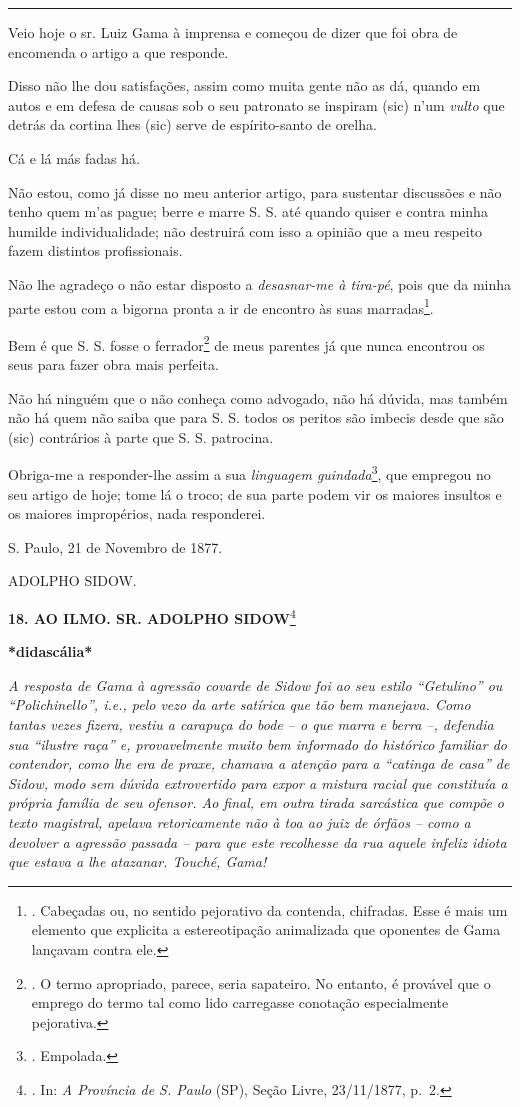 \begin{center}\rule{0.5\linewidth}{\linethickness}\end{center}

Veio hoje o sr. Luiz Gama à imprensa e começou de dizer que foi obra de
encomenda o artigo a que responde.

Disso não lhe dou satisfações, assim como muita gente não as dá, quando
em autos e em defesa de causas sob o seu patronato se inspiram (sic)
n'um \emph{vulto} que detrás da cortina lhes (sic) serve de
espírito-santo de orelha.

Cá e lá más fadas há.

Não estou, como já disse no meu anterior artigo, para sustentar
discussões e não tenho quem m'as pague; berre e marre S. S. até quando
quiser e contra minha humilde individualidade; não destruirá com isso a
opinião que a meu respeito fazem distintos profissionais.

Não lhe agradeço o não estar disposto a \emph{desasnar-me à tira-pé},
pois que da minha parte estou com a bigorna pronta a ir de encontro às
suas marradas\footnote{. Cabeçadas ou, no sentido pejorativo da
  contenda, chifradas. Esse é mais um elemento que explicita a
  estereotipação animalizada que oponentes de Gama lançavam contra ele.}.

Bem é que S. S. fosse o ferrador\footnote{. O termo apropriado, parece,
  seria sapateiro. No entanto, é provável que o emprego do termo tal
  como lido carregasse conotação especialmente pejorativa.} de meus
parentes já que nunca encontrou os seus para fazer obra mais perfeita.

Não há ninguém que o não conheça como advogado, não há dúvida, mas
também não há quem não saiba que para S. S. todos os peritos são imbecis
desde que são (sic) contrários à parte que S. S. patrocina.

Obriga-me a responder-lhe assim a sua \emph{linguagem
guindada}\footnote{. Empolada.}, que empregou no seu artigo de hoje;
tome lá o troco; de sua parte podem vir os maiores insultos e os maiores
impropérios, nada responderei.

S. Paulo, 21 de Novembro de 1877.

ADOLPHO SIDOW.

\textbf{18. AO ILMO. SR. ADOLPHO SIDOW}\footnote{. In: \emph{A Província
  de S. Paulo} (SP), Seção Livre, 23/11/1877, p.~2.}

\textbf{*didascália*}

\emph{A resposta de Gama à agressão covarde de Sidow foi ao seu estilo
``Getulino'' ou ``Polichinello'', i.e., pelo vezo da arte satírica que
tão bem manejava. Como tantas vezes fizera, vestiu a carapuça do bode --
o que marra e berra --, defendia sua ``ilustre raça'' e, provavelmente
muito bem informado do histórico familiar do contendor, como lhe era de
praxe, chamava a atenção para a ``catinga de casa'' de Sidow, modo sem
dúvida extrovertido para expor a mistura racial que constituía a própria
família de seu ofensor. Ao final, em outra tirada sarcástica que compõe
o texto magistral, apelava retoricamente não à toa ao juiz de órfãos --
como a devolver a agressão passada -- para que este recolhesse da rua
aquele infeliz idiota que estava a lhe atazanar. Touché, Gama! }

